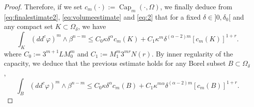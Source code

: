 \documentclass[JEP,XML,SOM,Unicode]{cedram}
\theoremstyle{definition}
\DeclareMathOperator{\Capa}{Cap}
\begin{document}
\begin{proof}
Therefore, if we set $c_m (\cdot):= \Capa_m (\cdot,\Omega)$, we finally deduce from \eqref{eq:finalestimate2}, \eqref{eq:volumeestimate} and \eqref{eq:2} that for a fixed $\delta\in{}]0,\delta_0[$ and any compact set $K \subset \Omega_\delta$, we have
\begin{equation}
\int_K (dd^c\varphi)^m\wedge\beta^{n-m} \leq C_0\kappa \delta^{\alpha} c_m (K) + C_1 \kappa^m \delta^{(\alpha -2) m } [c_m(K)]^{1+ r}.
\end{equation}
where $C_0:= 3^{m + 1} L M_0^m$ and $C_1:= M_1^{m} 3^{m r} N (r)$. By inner regularity of the capacity, we deduce that the previous estimate holds for any Borel subset $B \subset \Omega_\delta$, \ie \begin{equation} \label{eq:estimate1}
\int_B (dd^c\varphi)^m\wedge\beta^{n-m} \leq C_0 \kappa \delta^{\alpha} c_m (B) + C_1 \kappa^{m \alpha } \delta^{(\alpha -2) m} [c_m(B)]^{1+r}.
\end{equation}


\end{proof}
\end{document}
